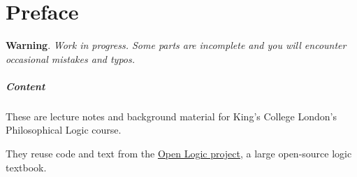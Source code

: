 \documentclass[../../../include/open-logic-chapter]{subfiles}
\begin{document}
\chapter{Preface}

\textbf{Warning}. \emph{Work in progress. Some parts are incomplete and you will encounter occasional mistakes and typos.}


\paragraph{Content}

These are lecture notes and background material for King's College London's Philosophical Logic course.

They reuse code and text from the \href{http://openlogicproject.org/}{Open Logic project}, a large open-source logic textbook.




\end{document}
